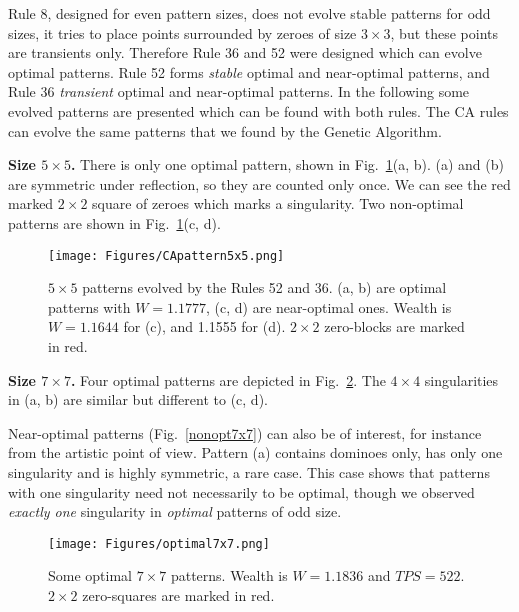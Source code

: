 \documentclass[10pt,a4paper]{article}  %
\begin{document}
Rule 8, designed for even pattern sizes, does not evolve stable patterns for odd sizes, it tries to place points surrounded by zeroes of size $3 \times 3$, but these points are transients only.
Therefore Rule 36 and 52 were designed which can evolve optimal patterns. 
Rule 52 forms \textit{stable} optimal and near-optimal patterns, 
and Rule 36 \textit{transient} optimal and near-optimal patterns.
In the following some evolved patterns are presented which can be found with both rules.  
The CA rules can evolve the same patterns that we found by the Genetic Algorithm. 


\textbf{Size $5\times 5$.}
There is only one optimal pattern, shown in Fig.~\ref{CApattern5x5}(a, b).
(a) and (b) are symmetric under reflection, so they are counted only once. 
We can see the red marked $2\times 2$ square of zeroes which marks a singularity.
Two non-optimal patterns are shown in Fig.~\ref{CApattern5x5}(c, d).


\begin{figure}[H] 
\centering
\texttt{[image: Figures/CApattern5x5.png]}	
\caption{
$5 \times 5$ patterns evolved by the Rules 52 and 36. 
(a, b) are optimal patterns with $W=1.1777$,
(c, d) are near-optimal ones. 
Wealth is $W= 1.1644$ for (c), and 1.1555  for (d). 
$2\times2$ zero-blocks are marked in red.
}
\label{CApattern5x5}
\end{figure}


\textbf{Size $7\times 7$.}
Four optimal patterns are depicted in Fig.~\ref{optimal7x7}.
The $4 \times 4$ singularities in (a, b) are similar
but different to (c, d).

Near-optimal patterns (Fig.~\ref{nonopt7x7}) 
can also be of interest, for instance from the artistic point of view.
Pattern (a) contains dominoes only, has only one singularity and is highly symmetric,
a rare case.
This case shows that patterns with one singularity need not necessarily to be optimal,
though we observed \textit{exactly one} singularity in \textit{optimal} patterns of odd size.


\begin{figure}[H] 
\centering
\texttt{[image: Figures/optimal7x7.png]}	
\caption{
Some optimal $7\times 7$ patterns. Wealth is $W= 1.1836$  and $TPS=522$.
 $2 \times 2$ zero-squares are marked in red.
}
\label{optimal7x7}
\end{figure}
\end{document}
